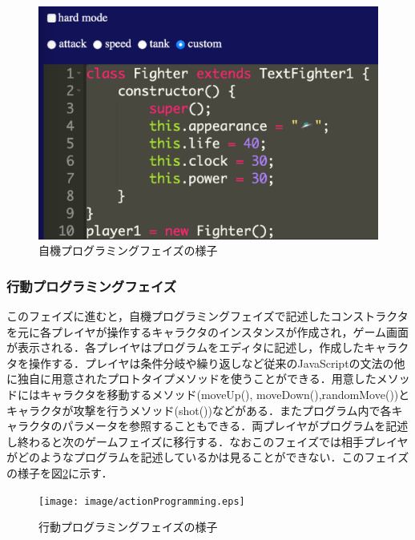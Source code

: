 \begin{figure}[!h]
  \begin{center}
    \includegraphics[width=1.0\linewidth]{image/characterProgramming.eps}
  \end{center}
    \vspace{-8mm} 
  \caption{自機プログラミングフェイズの様子}
  \label{characterProgramming}
\end{figure}

\subsubsection{行動プログラミングフェイズ}
このフェイズに進むと，自機プログラミングフェイズで記述したコンストラクタを元に各プレイヤが操作するキャラクタのインスタンスが作成され，ゲーム画面が表示される．各プレイヤはプログラムをエディタに記述し，作成したキャラクタを操作する．プレイヤは条件分岐や繰り返しなど従来のJavaScriptの文法の他に独自に用意されたプロトタイプメソッドを使うことができる．用意したメソッドにはキャラクタを移動するメソッド(moveUp(), moveDown(),randomMove())とキャラクタが攻撃を行うメソッド(shot())などがある．またプログラム内で各キャラクタのパラメータを参照することもできる．両プレイヤがプログラムを記述し終わると次のゲームフェイズに移行する．なおこのフェイズでは相手プレイヤがどのようなプログラムを記述しているかは見ることができない．このフェイズの様子を図\ref{actionProgramming}に示す．

\begin{figure}[!h]
  \begin{center}
    \texttt{[image: image/actionProgramming.eps]}
  \end{center}
    \vspace{-8mm} 
  \caption{行動プログラミングフェイズの様子}
  \label{actionProgramming}
\end{figure}

